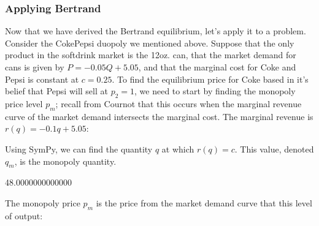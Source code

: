 \documentclass[letterpaper,10pt,english]{jupyterBook}
\begin{document}
\subsubsection{Applying Bertrand}
\label{\detokenize{content/07-game-theory/bertrand:applying-bertrand}}
\sphinxAtStartPar
Now that we have derived the Bertrand equilibrium, let’s apply it to a problem. Consider the Coke\sphinxhyphen{}Pepsi duopoly we mentioned above. Suppose that the only product in the soft\sphinxhyphen{}drink market is the 12\sphinxhyphen{}oz. can, that the market demand for cans is given by \(P = -0.05 Q + 5.05\), and that the marginal cost for Coke and Pepsi is constant at \(c = 0.25\). To find the equilibrium price for Coke based in it’s belief that Pepsi will sell at \(p_2 = 1\), we need to start by finding the monopoly price level \(p_m\); recall from Cournot that this occurs when the marginal revenue curve of the market demand intersects the marginal cost. The marginal revenue is \(r(q) = -0.1 q + 5.05\):

\noindent{}

\sphinxAtStartPar
Using SymPy, we can find the quantity \(q\) at which \(r(q) = c\). This value, denoted \(q_m\), is the monopoly quantity.

\begin{sphinxVerbatim}[commandchars=\\\{\}]
  
  
      

   
\end{sphinxVerbatim}

\begin{sphinxVerbatim}[commandchars=\\\{\}]
48.0000000000000
\end{sphinxVerbatim}

\sphinxAtStartPar
The monopoly price \(p_m\) is the price from the market demand curve that this level of output:

\begin{sphinxVerbatim}[commandchars=\\\{\}]
  
      

   
\end{sphinxVerbatim}
\end{document}
